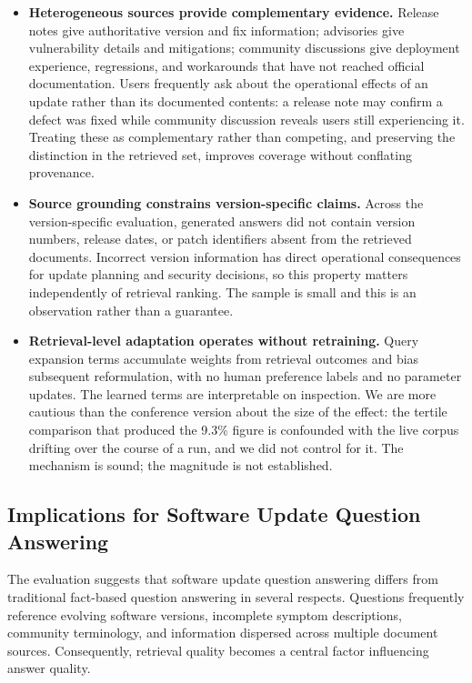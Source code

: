\documentclass[acmsmall,review,anonymous,screen]{acmart}
\begin{document}
\begin{itemize}
  \item \textbf{Heterogeneous sources provide complementary evidence.} Release
  notes give authoritative version and fix information; advisories give
  vulnerability details and mitigations; community discussions give deployment
  experience, regressions, and workarounds that have not reached official
  documentation. Users frequently ask about the operational effects of an update
  rather than its documented contents: a release note may confirm a defect was
  fixed while community discussion reveals users still experiencing it.
  Treating these as complementary rather than competing, and preserving the
  distinction in the retrieved set, improves coverage without conflating
  provenance.

  \item \textbf{Source grounding constrains version-specific claims.} Across the
  version-specific evaluation, generated answers did not contain version
  numbers, release dates, or patch identifiers absent from the retrieved
  documents. Incorrect version information has direct operational consequences
  for update planning and security decisions, so this property matters
  independently of retrieval ranking. The sample is small and this is an
  observation rather than a guarantee.

  \item \textbf{Retrieval-level adaptation operates without retraining.} Query
  expansion terms accumulate weights from retrieval outcomes and bias subsequent
  reformulation, with no human preference labels and no parameter updates. The
  learned terms are interpretable on inspection. We are more cautious than the
  conference version about the size of the effect: the tertile comparison that
  produced the 9.3\% figure is confounded with the live corpus drifting over the
  course of a run, and we did not control for it. The mechanism is sound; the
  magnitude is not established.
\end{itemize}

\subsection{Implications for Software Update Question Answering}

The evaluation suggests that software update question answering differs
from traditional fact-based question answering in several respects.
Questions frequently reference evolving software versions, incomplete
symptom descriptions, community terminology, and information dispersed
across multiple document sources. Consequently, retrieval quality
becomes a central factor influencing answer quality.
\end{document}
